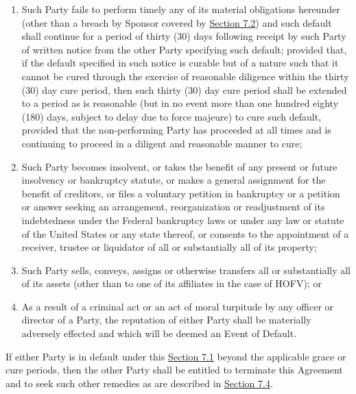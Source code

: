 \documentclass[]{article}
\begin{document}
\begin{enumerate}
\begin{enumerate}
    \begin{enumerate}
    \def\labelenumiii{\alph{enumiii}.}
    \item
      Such Party fails to perform timely any of its material obligations
      hereunder (other than a breach by Sponsor covered by
      \uline{Section 7.2}) and such default shall continue for a period
      of thirty (30) days following receipt by such Party of written
      notice from the other Party specifying such default; provided
      that, if the default specified in such notice is curable but of a
      nature such that it cannot be cured through the exercise of
      reasonable diligence within the thirty (30) day cure period, then
      such thirty (30) day cure period shall be extended to a period as
      is reasonable (but in no event more than one hundred eighty (180)
      days, subject to delay due to force majeure) to cure such default,
      provided that the non-performing Party has proceeded at all times
      and is continuing to proceed in a diligent and reasonable manner
      to cure;
    \item
      Such Party becomes insolvent, or takes the benefit of any present
      or future insolvency or bankruptcy statute, or makes a general
      assignment for the benefit of creditors, or files a voluntary
      petition in bankruptcy or a petition or answer seeking an
      arrangement, reorganization or readjustment of its indebtedness
      under the Federal bankruptcy laws or under any law or statute of
      the United States or any state thereof, or consents to the
      appointment of a receiver, trustee or liquidator of all or
      substantially all of its property;
    \item
      Such Party sells, conveys, assigns or otherwise transfers all or
      substantially all of its assets (other than to one of its
      affiliates in the case of HOFV); or
    \item
      As a result of a criminal act or an act of moral turpitude by any
      officer or director of a Party, the reputation of either Party
      shall be materially adversely effected and which will be deemed an
      Event of Default.
    \end{enumerate}
  \end{enumerate}
\end{enumerate}

If either Party is in default under this \uline{Section 7.1} beyond the
applicable grace or cure periods, then the other Party shall be entitled
to terminate this Agreement and to seek such other remedies as are
described in \uline{Section 7.4}.
\end{document}

